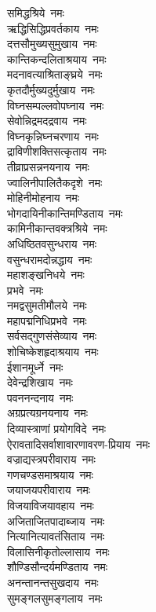 \begin{multicols}{2}
\begin{flushleft}
समिद्धश्रिये~नमः\\
ऋद्धिसिद्धिप्रवर्तकाय~नमः\\
दत्तसौमुख्यसुमुखाय~नमः\hfill{}\\
कान्तिकन्दलिताश्रयाय~नमः\\
मदनावत्याश्रिताङ्घ्रये~नमः\\
कृतदौर्मुख्यदुर्मुखाय~नमः\\
विघ्नसम्पल्लवोपघ्नाय~नमः\\
सेवोन्निद्रमदद्रवाय~नमः\\
विघ्नकृन्निघ्नचरणाय~नमः\\
द्राविणीशक्तिसत्कृताय~नमः\\
तीव्राप्रसन्ननयनाय~नमः\\
ज्वालिनीपालितैकदृशे~नमः\\
मोहिनीमोहनाय~नमः\hfill{}\\
भोगदायिनीकान्तिमण्डिताय~नमः\\
कामिनीकान्तवक्त्रश्रिये~नमः\\
अधिष्ठितवसुन्धराय~नमः\\
वसुन्धरामदोन्नद्धाय~नमः\\
महाशङ्खनिधये~नमः\\
प्रभवे~नमः\\
नमद्वसुमतीमौलये~नमः\\
महापद्मनिधिप्रभवे~नमः\\
सर्वसद्गुणसंसेव्याय~नमः\\
शोचिष्केशहृदाश्रयाय~नमः\hfill{}\\
ईशानमूर्ध्ने~नमः\\
देवेन्द्रशिखाय~नमः\\
पवननन्दनाय~नमः\\
अग्रप्रत्यग्रनयनाय~नमः\\
दिव्यास्त्राणां प्रयोगविदे~नमः\\
ऐरावतादिसर्वाशावारणावरण-प्रियाय~नमः\\
वज्राद्यस्त्रपरीवाराय~नमः\\
गणचण्डसमाश्रयाय~नमः\\
जयाजयपरीवाराय~नमः\\
विजयाविजयावहाय~नमः\hfill{}\\
अजिताजितपादाब्जाय~नमः\\
नित्यानित्यावतंसिताय~नमः\\
विलासिनीकृतोल्लासाय~नमः\\
शौण्डिसौन्दर्यमण्डिताय~नमः\\
अनन्तानन्तसुखदाय~नमः\\
सुमङ्गलसुमङ्गलाय~नमः\\

\end{flushleft}
\end{multicols}
